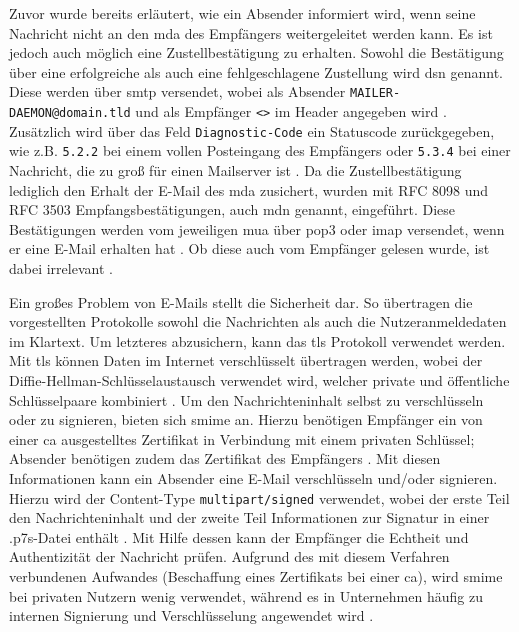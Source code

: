 Zuvor wurde bereits erläutert, wie ein Absender informiert wird, wenn seine Nachricht nicht an den \acrshort{mda} des Empfängers weitergeleitet werden kann. Es ist jedoch auch möglich eine Zustellbestätigung zu erhalten. Sowohl die Bestätigung über eine erfolgreiche als auch eine fehlgeschlagene Zustellung wird \acrfull{dsn} genannt. Diese werden über \acrshort{smtp} versendet, wobei als Absender \texttt{MAILER-DAEMON@domain.tld} und als Empfänger \texttt{<>} im Header angegeben wird \citep[S. 19 ff.]{RFC3461}. Zusätzlich wird über das Feld \texttt{Diagnostic-Code} ein Statuscode zurückgegeben, wie z.B. \texttt{5.2.2} bei einem vollen Posteingang des Empfängers oder \texttt{5.3.4} bei einer Nachricht, die zu groß für einen Mailserver ist \citep[S. 7 ff.]{RFC3463}. Da die Zustellbestätigung lediglich den Erhalt der E-Mail des \acrshort{mda} zusichert, wurden mit RFC 8098 und RFC 3503 Empfangsbestätigungen, auch \acrfull{mdn} genannt, eingeführt. Diese Bestätigungen werden vom jeweiligen \acrshort{mua} über \acrshort{pop3} oder \acrshort{imap} versendet, wenn er eine E-Mail erhalten hat \citep[S. 3 f.]{RFC3503}. Ob diese auch vom Empfänger gelesen wurde, ist dabei irrelevant \citep[S. 30 f.]{RFC8098}.

Ein großes Problem von E-Mails stellt die Sicherheit dar. So übertragen die vorgestellten Protokolle sowohl die Nachrichten als auch die Nutzeranmeldedaten im Klartext. Um letzteres abzusichern, kann das \acrfull{tls} Protokoll verwendet werden. Mit \acrshort{tls} können Daten im Internet verschlüsselt übertragen werden, wobei der Diffie-Hellman-Schlüsselaustausch verwendet wird, welcher private und öffentliche Schlüsselpaare kombiniert \citep[S. 95 f.]{RFC8446}. Um den Nachrichteninhalt selbst zu verschlüsseln oder zu signieren, bieten sich \acrfull{smime} an. Hierzu benötigen Empfänger ein von einer \acrfull{ca} ausgestelltes Zertifikat in Verbindung mit einem privaten Schlüssel; Absender benötigen zudem das Zertifikat des Empfängers \citep[S. 5 ff.]{RFC8551}. Mit diesen Informationen kann ein Absender eine E-Mail verschlüsseln und/oder signieren. Hierzu wird der Content-Type \texttt{multipart/signed} verwendet, wobei der erste Teil den Nachrichteninhalt und der zweite Teil Informationen zur Signatur in einer .p7s-Datei enthält \citep[S. 30 ff.]{RFC8551}. Mit Hilfe dessen kann der Empfänger die Echtheit und Authentizität der Nachricht prüfen. Aufgrund des mit diesem Verfahren verbundenen Aufwandes (Beschaffung eines Zertifikats bei einer \acrshort{ca}), wird \acrshort{smime} bei privaten Nutzern wenig verwendet, während es in Unternehmen häufig zu internen Signierung und Verschlüsselung angewendet wird \citep[S. 266]{Kappes2013}.


